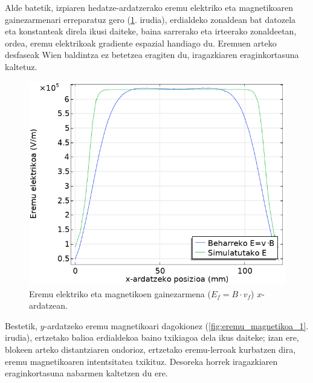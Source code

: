 \documentclass[12pt]{article}
\numberwithin{figure}{section}
\numberwithin{equation}{section}
\begin{document}
Alde batetik, izpiaren hedatze-ardatzerako eremu elektriko eta magnetikoaren gainezarmenari erreparatuz gero (\ref{fig:eremu_gainezarmena_1}. irudia), erdialdeko zonaldean bat datozela eta konstanteak direla ikusi daiteke, baina sarrerako eta irteerako zonaldeetan, ordea, eremu elektrikoak gradiente espazial handiago du. Eremuen arteko desfaseak Wien baldintza ez betetzea eragiten du, iragazkiaren eraginkortasuna kaltetuz.

\begin{figure}[h]
    \centering
    \includegraphics[width=0.6\linewidth]{4 - Diseinua/eremu_gainezarmena_1.png}
    \caption{Eremu elektriko eta magnetikoen gainezarmena ($E_f=B\cdot v_f$) $x$-ardatzean.}
    \label{fig:eremu_gainezarmena_1}
\end{figure}
\newpage

Bestetik, $y$-ardatzeko eremu magnetikoari dagokionez (\ref{fig:eremu_magnetikoa_1}. irudia), ertzetako balioa erdialdekoa baino txikiagoa dela ikus daiteke; izan ere, blokeen arteko distantziaren ondorioz, ertzetako eremu-lerroak kurbatzen dira, eremu magnetikoaren intentsitatea txikituz. Desoreka horrek iragazkiaren eraginkortasuna nabarmen kaltetzen du ere.
\end{document}
